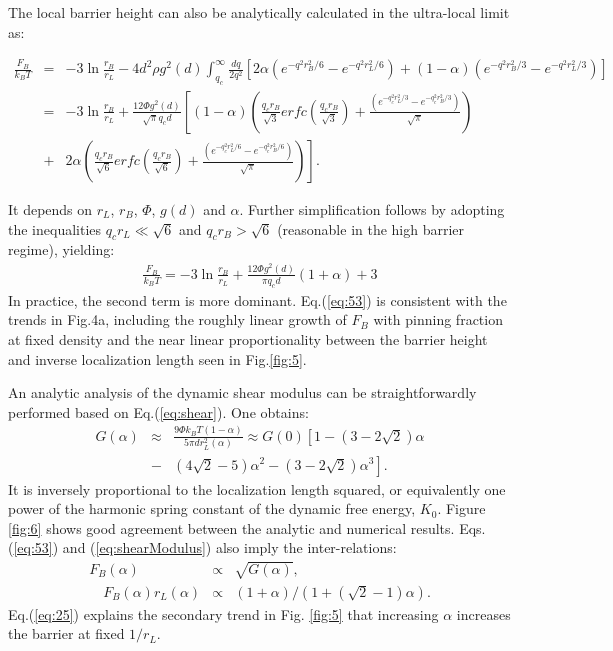 \documentclass[twocolumn,showpacs,preprintnumbers,amsmath,amssymb,unsortedaddress,
]{revtex4-1}
\begin{document}
The local barrier height can also be analytically calculated in the ultra-local limit as:
\begin{widetext}
\begin{eqnarray}
\frac{F_B}{k_BT} &=& -3\ln\frac{r_B}{r_L}-4d^2\rho g^2(d)\int_{q_c}^\infty \frac{dq}{2q^2} \left[2\alpha\left(e^{-q^2r_B^2/6}-e^{-q^2r_L^2/6}\right) + (1-\alpha)\left(e^{-q^2r_B^2/3} -e^{-q^2r_L^2/3} \right)\right] \nonumber\\
&=& -3\ln\frac{r_B}{r_L}+\frac{12\Phi g^2(d)}{\sqrt{\pi} q_cd}\left[(1-\alpha)\left(\frac{q_cr_B}{\sqrt{3}}erfc\left(\frac{q_cr_B}{\sqrt{3}} \right)+\frac{\left(e^{-q_c^2r_L^2/3}-e^{-q_c^2r_B^2/3} \right)}{\sqrt{\pi}} \right)\right. \nonumber\\
&+& \left. 2\alpha\left(\frac{q_cr_B}{\sqrt{6}}erfc\left(\frac{q_cr_B}{\sqrt{6}} \right)+\frac{\left(e^{-q_c^2r_L^2/6}-e^{-q_c^2r_B^2/6} \right)}{\sqrt{\pi}}  \right) \right].
\label{eq:52}
\end{eqnarray}
\end{widetext}
It depends on $r_L$, $r_B$, $\Phi$, $g(d)$ and $\alpha$. Further simplification follows by adopting the inequalities  $q_cr_L\ll \sqrt{6}$ and $q_cr_B > \sqrt{6}$ (reasonable in the high barrier regime), yielding:
\begin{eqnarray}
\frac{F_B}{k_BT} = -3\ln\frac{r_B}{r_L}+\frac{12\Phi g^2(d)}{\pi q_cd}\left(1+\alpha\right)+3
\label{eq:53}
\end{eqnarray}
In practice, the second term is more dominant. Eq.(\ref{eq:53}) is consistent with the trends in Fig.4a, including the roughly linear growth of $F_B$ with pinning fraction at fixed density and the near linear proportionality between the barrier height and inverse localization length seen in Fig.\ref{fig:5}.

An analytic analysis of the dynamic shear modulus can be straightforwardly performed based on Eq.(\ref{eq:shear}). One obtains:
\begin{eqnarray}
G(\alpha) &\approx& \frac{9\Phi k_BT(1-\alpha)}{5\pi d r_L^2(\alpha)} \approx G(0)\left[1- \left(3-2\sqrt{2}\right)\alpha \right. \nonumber\\
 &-& \left.\left(4\sqrt{2}-5\right)\alpha^2 - \left(3-2\sqrt{2}\right)\alpha^3\right].
\label{eq:shearModulus}
\end{eqnarray}
It is inversely proportional to the localization length squared, or equivalently one power of the harmonic spring constant of the dynamic free energy, $K_0$. Figure \ref{fig:6} shows good agreement between the analytic and numerical results. Eqs. (\ref{eq:53}) and (\ref{eq:shearModulus}) also imply the inter-relations:
\begin{eqnarray}
F_B(\alpha)&\varpropto&\sqrt{G(\alpha)}, \\
\quad F_B(\alpha)r_L(\alpha) &\varpropto& (1+\alpha)/(1+(\sqrt{2}-1)\alpha).
\label{eq:25}
\end{eqnarray}
Eq.(\ref{eq:25}) explains the secondary trend in Fig. \ref{fig:5} that increasing $\alpha$ increases the barrier at fixed $1/r_L$.
\end{document}
